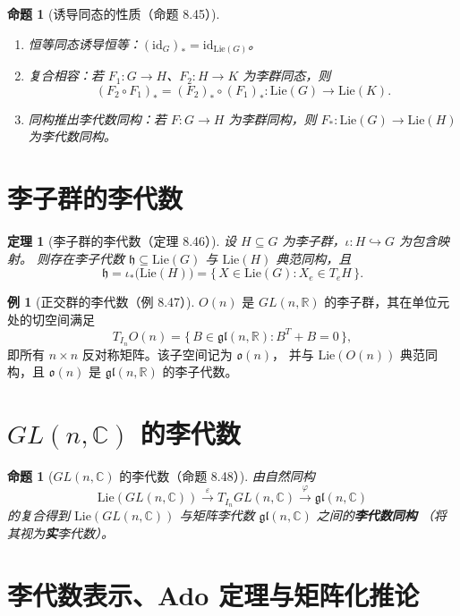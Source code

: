 \documentclass[11pt,a4paper]{article}
\newcommand{\R}{\mathbb{R}}
\newcommand{\C}{\mathbb{C}}
\newcommand{\gl}{\mathfrak{gl}}
\newcommand{\oo}{\mathfrak{o}}
\newcommand{\Lie}{\mathrm{Lie}}
\newcommand{\id}{\mathrm{id}}
\theoremstyle{definition}
\newtheorem{example}[definition]{例}
\theoremstyle{plain}
\newtheorem{theorem}[definition]{定理}
\newtheorem{proposition}[definition]{命题}
\begin{document}
\begin{proposition}[诱导同态的性质（命题 8.45）]
\begin{enumerate}[label=(\alph*)]
\item 恒等同态诱导恒等：$(\id_G)_*=\id_{\Lie(G)}$。
\item 复合相容：若 $F_1:G\to H$、$F_2:H\to K$ 为李群同态，则
\[
(F_2\circ F_1)_*=(F_2)_*\circ(F_1)_*:\Lie(G)\to\Lie(K).
\]
\item 同构推出李代数同构：若 $F:G\to H$ 为李群同构，则 $F_*:\Lie(G)\to\Lie(H)$ 为李代数同构。
\end{enumerate}
\end{proposition}

\section{李子群的李代数}

\begin{theorem}[李子群的李代数（定理 8.46）]
设 $H\subseteq G$ 为李子群，$\iota:H\hookrightarrow G$ 为包含映射。
则存在李子代数 $\mathfrak h\subseteq \Lie(G)$ 与 $\Lie(H)$ 典范同构，且
\[
\mathfrak h=\iota_*\bigl(\Lie(H)\bigr)
=\{\,X\in \Lie(G): X_e\in T_eH\,\}. \tag{8.17}
\]
\end{theorem}

\begin{example}[正交群的李代数（例 8.47）]
$O(n)$ 是 $GL(n,\R)$ 的李子群，其在单位元处的切空间满足
\[
T_{I_n}O(n)=\{\,B\in\gl(n,\R):B^T+B=0\,\},
\]
即所有 $n\times n$ 反对称矩阵。该子空间记为 $\oo(n)$，
并与 $\Lie(O(n))$ 典范同构，且 $\oo(n)$ 是 $\gl(n,\R)$ 的李子代数。
\end{example}

\section{$GL(n,\C)$ 的李代数}

\begin{proposition}[$GL(n,\C)$ 的李代数（命题 8.48）]
由自然同构
\[
\Lie(GL(n,\C))\xrightarrow{\ \varepsilon\ }T_{I_n}GL(n,\C)\xrightarrow{\ \varphi\ }\gl(n,\C) \tag{8.18}
\]
的复合得到 $\Lie(GL(n,\C))$ 与矩阵李代数 $\gl(n,\C)$ 之间的\textbf{李代数同构}
（将其视为\textbf{实}李代数）。
\end{proposition}

\section{李代数表示、Ado 定理与矩阵化推论}
\end{document}
